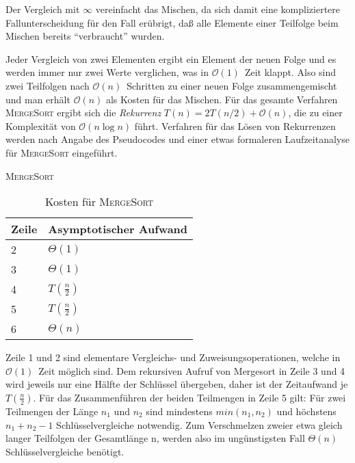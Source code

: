 \documentclass[ngerman,draft,parskip=half*,twoside]{scrreprt}
\theoremstyle{break}
\theoremstyle{nonumberbreak}
\newcommand*{\OO}{\mathcal{O}}      %
\DeclarePairedDelimiter{\floor}{\lfloor}{\rfloor}
\begin{document}
Der Vergleich mit $\infty$ vereinfacht das Mischen, da sich damit eine kompliziertere Fallunterscheidung für den Fall erübrigt, 
daß alle Elemente einer Teilfolge beim Mischen bereits "`verbraucht"' wurden.

Jeder Vergleich von zwei Elementen ergibt ein Element der neuen Folge und es werden immer nur zwei Werte verglichen, was in
$\OO(1)$~Zeit klappt. Also sind zwei Teilfolgen nach $\OO(n)$~Schritten zu einer neuen Folge zusammengemischt und man erhält
$\OO(n)$ als Kosten für das Mischen.
Für das gesamte Verfahren \textsc{MergeSort} ergibt sich die \textit{Rekurrenz} $T(n)=2T(n/2)+\OO(n)$, die zu einer Komplexität von $\OO(n
\log n)$ führt. Verfahren für das Lösen von Rekurrenzen werden nach Angabe des Pseudocodes und einer etwas
formaleren Laufzeitanalyse für \textsc{MergeSort} eingeführt.

%
\begin{algorithm}
  \caption{\textsc{MergeSort}}
\end{algorithm}

\begin{table}[h]
  \begin{tabular}{*{2}{l}}
    Zeile & Asymptotischer Aufwand\\
    \hline
    2 & $\Theta(1)$\\
    3 & $\Theta(1)$\\
    4 & $T(\frac{n}{2})$\\
    5 & $T(\frac{n}{2})$\\
    6 & $\Theta(n)$\\
  \end{tabular}
  \caption{Kosten für \textsc{MergeSort}} 
\end{table}

Zeile 1 und 2 sind elementare Vergleichs- und Zuweisungsoperationen, welche in $\OO(1)$~Zeit möglich sind. 
Dem rekursiven Aufruf von Mergesort in Zeile 3 und 4 wird jeweils nur eine Hälfte der Schlüssel übergeben, 
daher ist der Zeitaufwand je $T(\frac{n}{2})$. Für das Zusammenführen der beiden Teilmengen in Zeile 5 gilt: 
Für zwei Teilmengen der Länge $n_1$ und $n_2$ sind mindestens $min(n_1,n_2)$ und höchstens $n_1 + n_2 -1$ Schlüsselvergleiche notwendig. 
Zum Verschmelzen zweier etwa gleich langer Teilfolgen der Gesamtlänge n, werden also im ungünstigsten Fall $\Theta(n)$ Schlüsselvergleiche benötigt.
\end{document}
